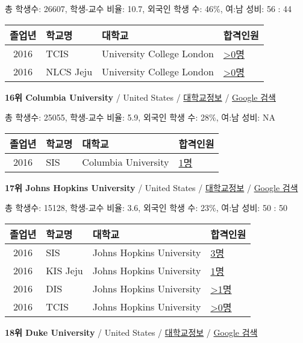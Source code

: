 \documentclass[13pt,]{article}
\begin{document}
총 학생수: 26607, 학생-교수 비율: 10.7, 외국인 학생 수: 46\%, 여:남
성비: 56 : 44

\begin{longtable}[]{@{}clll@{}}
\toprule
졸업년 & 학교명 & 대학교 & 합격인원\tabularnewline
\midrule
\endhead
2016 & TCIS & University College London &
\href{http://cafe.naver.com/assarabia/11598}{\textgreater{}0명}\tabularnewline
2016 & NLCS Jeju & University College London &
\href{http://cafe.naver.com/assarabia/11592}{\textgreater{}0명}\tabularnewline
\bottomrule
\end{longtable}

\textbf{16위 Columbia University} / United States /
\href{https://www.timeshighereducation.com/world-university-rankings/columbia-university?ranking-dataset=589595}{대학교정보}
/ \href{http://www.google.com/search?q=Columbia+University}{Google 검색}

총 학생수: 25055, 학생-교수 비율: 5.9, 외국인 학생 수: 28\%, 여:남 성비:
NA

\begin{longtable}[]{@{}clll@{}}
\toprule
졸업년 & 학교명 & 대학교 & 합격인원\tabularnewline
\midrule
\endhead
2016 & SIS & Columbia University &
\href{http://cafe.naver.com/assarabia/11589}{1명}\tabularnewline
\bottomrule
\end{longtable}

\textbf{17위 Johns Hopkins University} / United States /
\href{https://www.timeshighereducation.com/world-university-rankings/johns-hopkins-university?ranking-dataset=589595}{대학교정보}
/ \href{http://www.google.com/search?q=Johns+Hopkins+University}{Google
검색}

총 학생수: 15128, 학생-교수 비율: 3.6, 외국인 학생 수: 23\%, 여:남 성비:
50 : 50

\begin{longtable}[]{@{}clll@{}}
\toprule
졸업년 & 학교명 & 대학교 & 합격인원\tabularnewline
\midrule
\endhead
2016 & SIS & Johns Hopkins University &
\href{http://cafe.naver.com/assarabia/11589}{3명}\tabularnewline
2016 & KIS Jeju & Johns Hopkins University &
\href{http://cafe.naver.com/assarabia/11596}{1명}\tabularnewline
2016 & DIS & Johns Hopkins University &
\href{http://cafe.naver.com/assarabia/11591}{\textgreater{}1명}\tabularnewline
2016 & TCIS & Johns Hopkins University &
\href{http://cafe.naver.com/assarabia/11598}{\textgreater{}0명}\tabularnewline
\bottomrule
\end{longtable}

\textbf{18위 Duke University} / United States /
\href{https://www.timeshighereducation.com/world-university-rankings/duke-university?ranking-dataset=589595}{대학교정보}
/ \href{http://www.google.com/search?q=Duke+University}{Google 검색}
\end{document}
